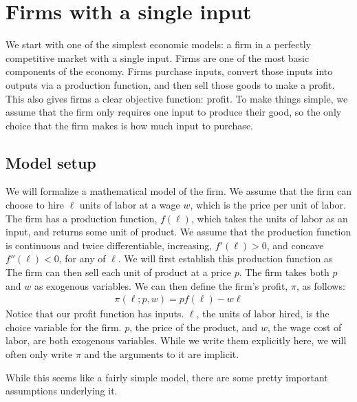 \chapter{Firms with a single input}
We start with one of the simplest economic models: a firm in a perfectly competitive market with a single input. Firms are one of the most basic components of the economy. Firms purchase inputs, convert those inputs into outputs via a production function, and then sell those goods to make a profit. This also gives firms a clear objective function: profit. To make things simple, we assume that the firm only requires one input to produce their good, so the only choice that the firm makes is how much input to purchase. 

\section{Model setup}
We will formalize a mathematical model of the firm. We assume that the firm can choose to hire $\ell$ units of labor at a wage $w$, which is the price per unit of labor. The firm has a production function, $f(\ell)$, which takes the units of labor as an input, and returns some unit of product. We assume that the production function is continuous and twice differentiable, increasing, $f'(\ell) > 0$, and concave $f''(\ell) < 0$, for any of $\ell$. We will first establish this production function as The firm can then sell each unit of product at a price $p$. The firm takes both $p$ and $w$ as exogenous variables. We can then define the firm's profit, $\pi$, as follows:
\begin{align}
    \pi(\ell; p, w) = p f(\ell) - w \ell \label{eq:profit_def}
\end{align}
Notice that our profit function has inputs. $\ell$, the units of labor hired, is the choice variable for the firm. $p$, the price of the product, and $w$, the wage cost of labor, are both exogenous variables. While we write them explicitly here, we will often only write $\pi$ and the arguments to it are implicit. 

While this seems like a fairly simple model, there are some pretty important assumptions underlying it.

